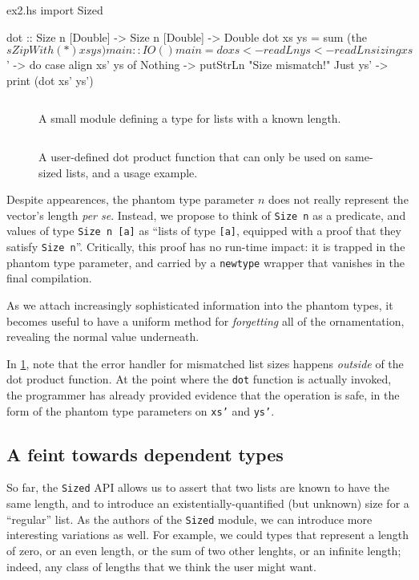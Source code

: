 \documentclass[format=sigplan, review=false, screen=true]{acmart}
\begin{document}
\begin{filecontents*}{ex2.hs}
import Sized

dot :: Size n [Double] -> Size n [Double] -> Double
dot xs ys = sum (the $ sZipWith (*) xs ys)

main :: IO ()
main = do
  xs <- readLn
  ys <- readLn
  sizing xs $ \xs' -> do
    case align xs' ys of
      Nothing  -> putStrLn "Size mismatch!"
      Just ys' -> print (dot xs' ys')
\end{filecontents*}

\begin{figure}
    \inputminted{haskell}{ex1.hs}
  \caption{A small module defining a type for lists with a known length.}
\end{figure}
\begin{figure}
    \inputminted{haskell}{ex2.hs}
    \caption{A user-defined dot product function that can only be used on same-sized lists,
    and a usage example. \label{dot-product}}
\end{figure}

Despite  appearences, the phantom type parameter $n$ does not really represent the vector's length
{\em per se}. Instead, we propose to think of \texttt{Size n} as a predicate, and values of
type \texttt{Size n [a]} as ``lists of type \texttt{[a]}, equipped with a proof
that they satisfy \texttt{Size n}''. Critically, this proof has no run-time impact: it is trapped in the phantom type parameter, and carried by a \texttt{newtype} wrapper that vanishes in
the final compilation.


As we attach increasingly sophisticated information into the phantom types, it becomes useful to
have a uniform method for \emph{forgetting} all of the ornamentation, revealing the normal
value underneath.

In \cref{dot-product}, note that the error handler for mismatched list sizes happens
\emph{outside} of the dot product function. At the point where the \texttt{dot} function
is actually invoked, the programmer has already provided evidence that the operation is
safe, in the form of the phantom type parameters on \texttt{xs'} and \texttt{ys'}.

\subsection{A feint towards dependent types}
So far, the \texttt{Sized} API allows us to assert that two lists are known to have the same
length, and to introduce an existentially-quantified (but unknown) size for a ``regular'' list.
As the authors of the \texttt{Sized} module, we can introduce more interesting variations as
well. For example, we could types that represent a length of zero, or an even length, or the
sum of two other lenghts, or an infinite length; indeed, any class of lengths that we
think the user might want.
\end{document}
